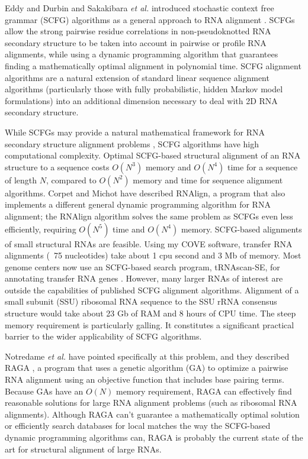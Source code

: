 \documentclass[11pt]{article}
\begin{document}
Eddy and Durbin and Sakakibara \emph{et al.} introduced stochastic
context free grammar (SCFG) algorithms as a general approach to RNA
alignment \cite{Eddy94,Sakakibara94c,Durbin98}. SCFGs allow the strong
pairwise residue correlations in non-pseudoknotted RNA secondary
structure to be taken into account in pairwise or profile RNA
alignments, while using a dynamic programming algorithm that
guarantees finding a mathematically optimal alignment in polynomial
time. SCFG alignment algorithms are a natural extension of standard
linear sequence alignment algorithms (particularly those with fully
probabilistic, hidden Markov model formulations) into an additional
dimension necessary to deal with 2D RNA secondary structure.

While SCFGs may provide a natural mathematical framework for RNA
secondary structure alignment problems \cite{Durbin98}, SCFG
algorithms have high computational complexity. Optimal SCFG-based
structural alignment of an RNA structure to a sequence costs $O(N^3)$
memory and $O(N^4)$ time for a sequence of length $N$, compared to
$O(N^2)$ memory and time for sequence alignment algorithms. Corpet and
Michot have described RNAlign, a program that also implements a
different general dynamic programming algorithm for RNA alignment; the
RNAlign algorithm solves the same problem as SCFGs even less
efficiently, requiring $O(N^5)$ time and $O(N^4)$ memory.  SCFG-based
alignments of small structural RNAs are feasible. Using my COVE
software, transfer RNA alignments (~75 nucleotides) take about 1 cpu
second and 3 Mb of memory. Most genome centers now use an SCFG-based
search program, tRNAscan-SE, for annotating transfer RNA genes
\cite{LoweEddy97}. However, many larger RNAs of interest are outside
the capabilities of published SCFG alignment algorithms. Alignment of
a small subunit (SSU) ribosomal RNA sequence to the SSU rRNA consensus
structure would take about 23 Gb of RAM and 8 hours of CPU time. The
steep memory requirement is particularly galling. It constitutes a
significant practical barrier to the wider applicability of SCFG
algorithms.


Notredame \emph{et al.} have pointed specifically at this problem, and
they described RAGA \cite{Notredame97}, a program that uses a genetic
algorithm (GA) to optimize a pairwise RNA alignment using an objective
function that includes base pairing terms. Because GAs have an $O(N)$
memory requirement, RAGA can effectively find reasonable solutions for
large RNA alignment problems (such as ribosomal RNA
alignments). Although RAGA can't guarantee a mathematically optimal
solution or efficiently search databases for local matches the way the
SCFG-based dynamic programming algorithms can, RAGA is probably the
current state of the art for structural alignment of large RNAs.
\end{document}
